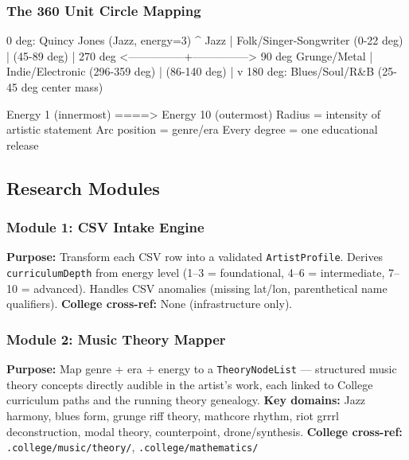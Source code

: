\documentclass[11pt,letterpaper]{article}
\begin{document}
\subsubsection{The 360\textdegree{} Unit Circle Mapping}

\begin{asciibox}
                   0 deg: Quincy Jones (Jazz, energy=3)
                          ^
              Jazz        |        Folk/Singer-Songwriter
          (0-22 deg)      |           (45-89 deg)
                          |
  270 deg <---------------+---------------> 90 deg
  Grunge/Metal            |            Indie/Electronic
  (296-359 deg)           |            (86-140 deg)
                          |
                          v
                   180 deg: Blues/Soul/R&B
                   (25-45 deg center mass)

  Energy 1 (innermost) ====> Energy 10 (outermost)
  Radius = intensity of artistic statement
  Arc position = genre/era
  Every degree = one educational release
\end{asciibox}

\subsection{Research Modules}

\subsubsection{Module 1: CSV Intake Engine}
\textbf{Purpose:} Transform each CSV row into a validated \texttt{ArtistProfile}. Derives
\texttt{curriculumDepth} from energy level (1--3 = foundational, 4--6 = intermediate,
7--10 = advanced). Handles CSV anomalies (missing lat/lon, parenthetical name qualifiers).
\textbf{College cross-ref:} None (infrastructure only).

\subsubsection{Module 2: Music Theory Mapper}
\textbf{Purpose:} Map genre + era + energy to a \texttt{TheoryNodeList} --- structured
music theory concepts directly audible in the artist's work, each linked to College
curriculum paths and the running theory genealogy.
\textbf{Key domains:} Jazz harmony, blues form, grunge riff theory, mathcore rhythm, riot
grrrl deconstruction, modal theory, counterpoint, drone/synthesis.
\textbf{College cross-ref:} \texttt{.college/music/theory/}, \texttt{.college/mathematics/}
\end{document}
